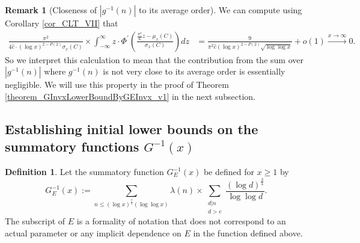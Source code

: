 \documentclass[11pt,reqno,a4letter]{article}
\numberwithin{figure}{section}
\numberwithin{table}{section}
\theoremstyle{plain}
\numberwithin{theorem}{section}
\theoremstyle{definition}
\newtheorem{remark}[theorem]{Remark}
\newtheorem{definition}[theorem]{Definition}
\begin{document}
\begin{remark}[Closeness of $|g^{-1}(n)|$ to its average order] 
\label{remark_ClosenessApproxgInvnByAvgOrder_v1} 
We can compute using Corollary \ref{cor_CLT_VII} that 
\begin{align*} 
\frac{\pi^2}{4 \widehat{c} \cdot (\log x)^{2-P(2)} \sigma_x(C)} \times 
     \int_{-\infty}^{\infty} 
     z \cdot \Phi^{\prime}\left(\frac{\frac{\pi^2}{6} z - \mu_x(C)}{\sigma_x(C)}\right) dz & = 
     \frac{9}{\pi^2 \widehat{c} (\log x)^{2-P(2)} \sqrt{\log\log x}} + o(1) 
     \xrightarrow{x \rightarrow \infty} 0. 
\end{align*} 
So we interpret this calculation to mean that the contribution from the sum 
over $|g^{-1}(n)|$ where $g^{-1}(n)$ is not very close to its average order is essentially 
negligible. We will use this property in the proof of 
Theorem \ref{theorem_GInvxLowerBoundByGEInvx_v1} in the next subsection. 
\end{remark} 

\subsection{Establishing initial lower bounds on the summatory functions $G^{-1}(x)$} 
\label{Section_ProofOfValidityOfAverageOrderLowerBounds} 

\begin{definition} 
Let the summatory function $G_E^{-1}(x)$ be defined for $x \geq 1$ by 
\begin{equation} 
\label{eqn_GEInvxSummatoryFuncDef_v1} 
G_E^{-1}(x) := \sum_{n \leq (\log x)^{\frac{7}{3}} (\log\log x)} \lambda(n) \times 
     \sum_{\substack{d|n \\ d > e}} \frac{(\log d)^{\frac{3}{4}}}{\log\log d}. 
\end{equation} 
The subscript of $E$ is a formality of 
notation that does not correspond to an actual parameter or any 
implicit dependence on $E$ in the function defined above. 
\end{definition} 
\end{document}
